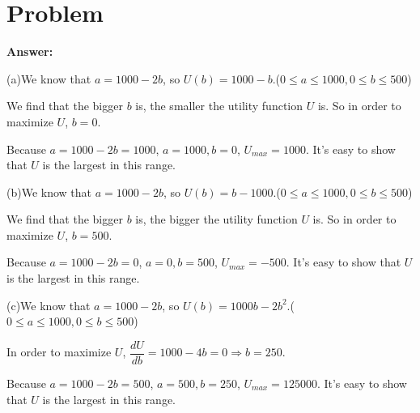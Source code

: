 \documentclass[a4 paper,12pt]{article}
\begin{document}
\section{Problem}
\noindent
\textbf{Answer:}
\par (a)We know that $a=1000-2b$, so $U(b)=1000-b$.($0\le a\le 1000,0\le b\le 500$)
\par We find that the bigger $b$ is, the smaller the utility function $U$ is. So in order to maximize $U$, $b=0$.
\par Because $a=1000-2b=1000$, $a=1000,b=0$, $U_{max}=1000$. It's easy to show that $U$ is the largest in this range.
\par (b)We know that $a=1000-2b$, so $U(b)=b-1000$.($0\le a\le 1000,0\le b\le 500$)
\par We find that the bigger $b$ is, the bigger the utility function $U$ is. So in order to maximize $U$, $b=500$.
\par Because $a=1000-2b=0$, $a=0,b=500$, $U_{max}=-500$. It's easy to show that $U$ is the largest in this range.
\par (c)We know that $a=1000-2b$, so $U(b)=1000b-2b^{2}$.($0\le a\le 1000,0\le b\le 500$)
\par In order to maximize $U$, $\dfrac{dU}{db}=1000-4b=0\Rightarrow b=250$.
\par Because $a=1000-2b=500$, $a=500,b=250$, $U_{max}=125000$. It's easy to show that $U$ is the largest in this range.
\end{document}
